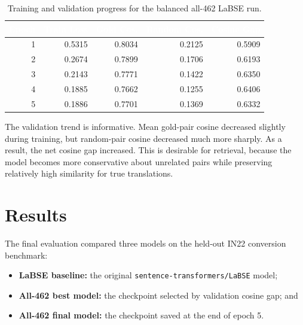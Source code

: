 \documentclass[12pt, a4paper]{article}
\begin{document}
\begin{table}[H]
\centering
\footnotesize
\renewcommand{\arraystretch}{1.25}
\begin{tabular}{r r r r r}
\toprule
\rowcolor{headerblue}
\textcolor{white}{\textbf{Epoch}} &
\textcolor{white}{\textbf{Train Loss}} &
\textcolor{white}{\textbf{Gold Cos.}} &
\textcolor{white}{\textbf{Random Cos.}} &
\textcolor{white}{\textbf{Cosine Gap}} \\
\midrule
\rowcolor{rowgray}
1 & 0.5315 & 0.8034 & 0.2125 & 0.5909 \\
2 & 0.2674 & 0.7899 & 0.1706 & 0.6193 \\
\rowcolor{rowgray}
3 & 0.2143 & 0.7771 & 0.1422 & 0.6350 \\
4 & 0.1885 & 0.7662 & 0.1255 & 0.6406 \\
\rowcolor{rowgray}
5 & 0.1886 & 0.7701 & 0.1369 & 0.6332 \\
\bottomrule
\end{tabular}
\caption{Training and validation progress for the balanced all-462 LaBSE run.}
\label{tab:training_progress}
\end{table}

The validation trend is informative. Mean gold-pair cosine decreased slightly during training, but random-pair cosine decreased much more sharply. As a result, the net cosine gap increased. This is desirable for retrieval, because the model becomes more conservative about unrelated pairs while preserving relatively high similarity for true translations.

\newpage

\section{Results}

The final evaluation compared three models on the held-out IN22 conversion benchmark:

\begin{itemize}[leftmargin=1.5cm, itemsep=4pt]
  \item \textbf{LaBSE baseline:} the original \texttt{sentence-transformers/LaBSE} model;
  \item \textbf{All-462 best model:} the checkpoint selected by validation cosine gap; and
  \item \textbf{All-462 final model:} the checkpoint saved at the end of epoch 5.
\end{itemize}
\end{document}
